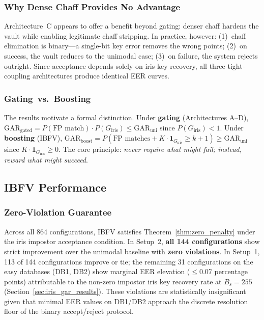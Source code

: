 \documentclass[3p,twocolumn]{elsarticle}
\newcommand{\IBFV}{\textsf{IBFV}}
\newcommand{\GAR}{\mathrm{GAR}}
\begin{document}
\subsubsection{Why Dense Chaff Provides No Advantage}
\label{sec:chaff_analysis}

Architecture~C appears to offer a benefit beyond gating: denser chaff hardens the vault while enabling legitimate chaff stripping. In practice, however: (1)~chaff elimination is binary---a single-bit key error removes the wrong points; (2)~on success, the vault reduces to the unimodal case; (3)~on failure, the system rejects outright. Since acceptance depends solely on iris key recovery, all three tight-coupling architectures produce identical EER curves.

\subsubsection{Gating~vs.\ Boosting}
\label{sec:taxonomy}

The results motivate a formal distinction. Under \textbf{gating} (Architectures A--D), $\GAR_{\text{gated}} = P(\text{FP match}) \cdot P(G_{\text{iris}}) \leq \GAR_{\text{uni}}$ since $P(G_{\text{iris}}) < 1$. Under \textbf{boosting} (\IBFV{}), $\GAR_{\text{boost}} = P(\text{FP matches} + K \cdot \mathbf{1}_{G_{\text{iris}}} \geq k{+}1) \geq \GAR_{\text{uni}}$ since $K \cdot \mathbf{1}_{G_{\text{iris}}} \geq 0$. The core principle: \emph{never require what might fail; instead, reward what might succeed}.

\subsection{IBFV Performance}
\label{sec:ibfv_results}

\subsubsection{Zero-Violation Guarantee}
Across all 864 configurations, \IBFV{} satisfies Theorem~\ref{thm:zero_penalty} under the iris impostor acceptance condition. In Setup~2, \textbf{all 144 configurations} show strict improvement over the unimodal baseline with \textbf{zero violations}. In Setup~1, 113 of 144 configurations improve or tie; the remaining 31 configurations on the easy databases (DB1, DB2) show marginal EER elevation ($\leq 0.07$ percentage points) attributable to the non-zero impostor iris key recovery rate at $B_s = 255$ (Section~\ref{sec:iris_gar_results}). These violations are statistically insignificant given that minimal EER values on DB1/DB2 approach the discrete resolution floor of the binary accept/reject protocol.
\end{document}
